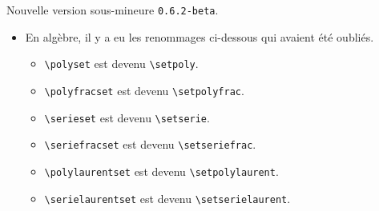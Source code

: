 Nouvelle version sous-mineure \verb+0.6.2-beta+.

\begin{itemize}[itemsep=.5em]
    \item En algèbre, il y a eu les renommages ci-dessous qui avaient été oubliés.
    \begin{itemize}[itemsep=.5em]
        \item \verb+\polyset+ est devenu \verb+\setpoly+.

        \item \verb+\polyfracset+ est devenu \verb+\setpolyfrac+.

        \item \verb+\serieset+ est devenu \verb+\setserie+.

        \item \verb+\seriefracset+ est devenu \verb+\setseriefrac+.

        \item \verb+\polylaurentset+ est devenu \verb+\setpolylaurent+.

        \item \verb+\serielaurentset+ est devenu \verb+\setserielaurent+.
    \end{itemize}
\end{itemize}
